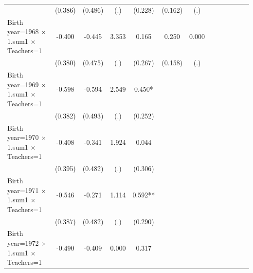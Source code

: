 {\begin{tabular}{l*{12}{c}}
                    &     (0.386)   &     (0.486)   &         (.)   &     (0.228)   &     (0.162)   &         (.)   &               &               &               &               &               &               \\
Birth year=1968 $\times$ 1.sum1 $\times$ Teachers=1&      -0.400   &      -0.445   &       3.353   &       0.165   &       0.250   &       0.000   &               &               &               &               &               &               \\
                    &     (0.380)   &     (0.475)   &         (.)   &     (0.267)   &     (0.158)   &         (.)   &               &               &               &               &               &               \\
Birth year=1969 $\times$ 1.sum1 $\times$ Teachers=1&      -0.598   &      -0.594   &       2.549   &       0.450*  &               &               &               &               &               &               &               &               \\
                    &     (0.382)   &     (0.493)   &         (.)   &     (0.252)   &               &               &               &               &               &               &               &               \\
Birth year=1970 $\times$ 1.sum1 $\times$ Teachers=1&      -0.408   &      -0.341   &       1.924   &       0.044   &               &               &               &               &               &               &               &               \\
                    &     (0.395)   &     (0.482)   &         (.)   &     (0.306)   &               &               &               &               &               &               &               &               \\
Birth year=1971 $\times$ 1.sum1 $\times$ Teachers=1&      -0.546   &      -0.271   &       1.114   &       0.592** &               &               &               &               &               &               &               &               \\
                    &     (0.387)   &     (0.482)   &         (.)   &     (0.290)   &               &               &               &               &               &               &               &               \\
Birth year=1972 $\times$ 1.sum1 $\times$ Teachers=1&      -0.490   &      -0.409   &       0.000   &       0.317   &               &               &               &               &               &               &               &               \\

\end{tabular}}

